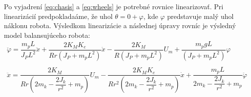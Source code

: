 Po vyjadrení \eqref{eq:chasis} a \eqref{eq:wheels} je potrebné rovnice linearizovať. Pri linearizácií predpokladaáme, že uhol $\theta = 0 + \varphi$, kde $\varphi$ predstavuje malý uhol náklonu robota. Výsledkom linearizácie a následnej úpravy rovníc je výsledný model balansujúceho robota:
\begin{equation}
\begin{gathered}
\ddot{\varphi} = \dfrac{m_p L}{J_P L^2}\ddot{x} + \dfrac{2K_M K_e}{Rr(J_P + m_p L^2)}\dot{x} - \dfrac{2K_M}{R(J_P + m_p L^2)} U_m + \dfrac{m_p g L}{(J_P + m_p L^2)}\varphi
\\
\\
\ddot{x} = \dfrac{2K_M}{Rr(2m_k - \dfrac{2J_k}{r^2} + m_p)} U_m - \dfrac{2K_M K_e}{Rr^2(2m_k - \dfrac{2J_k}{r^2} + m_p) }\dot{x} + \dfrac{m_p L}{2m_k - \dfrac{2J_k}{r^2} + m_p}\ddot{\varphi}
\end{gathered}
\end{equation}